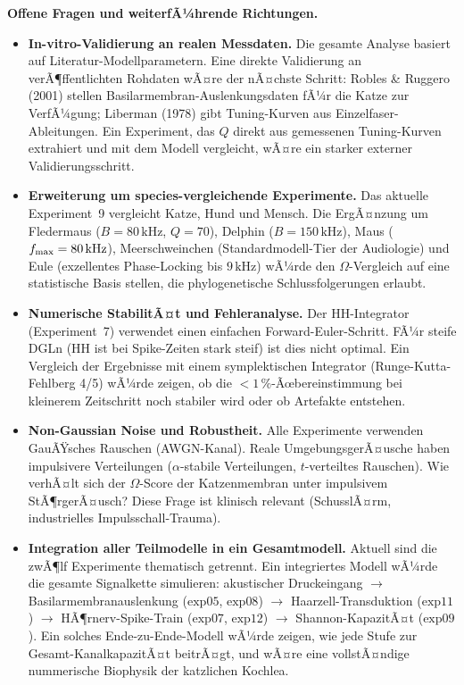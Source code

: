 ﻿\documentclass[12pt,a4paper,titlepage]{report}
\begin{document}
\textbf{Offene Fragen und weiterfÃ¼hrende Richtungen.}
\begin{itemize}[leftmargin=2em]
  \item \textbf{In-vitro-Validierung an realen Messdaten.}
    Die gesamte Analyse basiert auf Literatur-Modellparametern.
    Eine direkte Validierung an verÃ¶ffentlichten Rohdaten wÃ¤re
    der nÃ¤chste Schritt:
    Robles \& Ruggero (2001) stellen Basilarmembran-Auslenkungsdaten
    fÃ¼r die Katze zur VerfÃ¼gung;
    Liberman (1978) gibt Tuning-Kurven aus Einzelfaser-Ableitungen.
    Ein Experiment, das $Q$ direkt aus gemessenen Tuning-Kurven
    extrahiert und mit dem Modell vergleicht, wÃ¤re ein starker
    externer Validierungsschritt.
  \item \textbf{Erweiterung um species-vergleichende Experimente.}
    Das aktuelle Experiment~9 vergleicht Katze, Hund und Mensch.
    Die ErgÃ¤nzung um Fledermaus ($B=80\,\mathrm{kHz}$, $Q=70$),
    Delphin ($B=150\,\mathrm{kHz}$), Maus ($f_{\rm max}=80\,\mathrm{kHz}$),
    Meerschweinchen (Standardmodell-Tier der Audiologie)
    und Eule (exzellentes Phase-Locking bis $9\,\mathrm{kHz}$)
    wÃ¼rde den $\Omega$-Vergleich auf eine statistische Basis stellen,
    die phylogenetische Schlussfolgerungen erlaubt.
  \item \textbf{Numerische StabilitÃ¤t und Fehleranalyse.}
    Der HH-Integrator (Experiment~7) verwendet einen einfachen
    Forward-Euler-Schritt.
    FÃ¼r steife DGLn (HH ist bei Spike-Zeiten stark steif)
    ist dies nicht optimal.
    Ein Vergleich der Ergebnisse mit einem symplektischen
    Integrator (Runge-Kutta-Fehlberg 4/5) wÃ¼rde zeigen,
    ob die $<1\,\%$-Ãœbereinstimmung bei kleinerem Zeitschritt
    noch stabiler wird oder ob Artefakte entstehen.
  \item \textbf{Non-Gaussian Noise und Robustheit.}
    Alle Experimente verwenden GauÃŸsches Rauschen (AWGN-Kanal).
    Reale UmgebungsgerÃ¤usche haben impulsivere Verteilungen
    ($\alpha$-stabile Verteilungen, $t$-verteiltes Rauschen).
    Wie verhÃ¤lt sich der $\Omega$-Score der Katzenmembran unter
    impulsivem StÃ¶rgerÃ¤usch?
    Diese Frage ist klinisch relevant (SchusslÃ¤rm,
    industrielles Impulsschall-Trauma).
  \item \textbf{Integration aller Teilmodelle in ein Gesamtmodell.}
    Aktuell sind die zwÃ¶lf Experimente thematisch getrennt.
    Ein integriertes Modell wÃ¼rde die gesamte Signalkette simulieren:
    akustischer Druckeingang $\to$ Basilarmembranauslenkung
    ($\mathrm{exp}05$, $\mathrm{exp}08$) $\to$ Haarzell-Transduktion
    ($\mathrm{exp}11$) $\to$ HÃ¶rnerv-Spike-Train ($\mathrm{exp}07$,
    $\mathrm{exp}12$) $\to$ Shannon-KapazitÃ¤t ($\mathrm{exp}09$).
    Ein solches Ende-zu-Ende-Modell wÃ¼rde zeigen,
    wie jede Stufe zur Gesamt-KanalkapazitÃ¤t beitrÃ¤gt,
    und wÃ¤re eine vollstÃ¤ndige nummerische Biophysik der katzlichen Kochlea.
\end{itemize}
\end{document}
